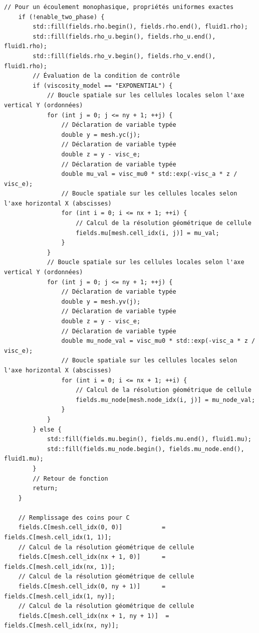 \documentclass[10pt,a4paper,oneside]{book}
\begin{document}
\begin{lstlisting}[language={[11]C++}]
    // Pour un écoulement monophasique, propriétés uniformes exactes
    if (!enable_two_phase) {
        std::fill(fields.rho.begin(), fields.rho.end(), fluid1.rho);
        std::fill(fields.rho_u.begin(), fields.rho_u.end(), fluid1.rho);
        std::fill(fields.rho_v.begin(), fields.rho_v.end(), fluid1.rho);
        // Évaluation de la condition de contrôle
        if (viscosity_model == "EXPONENTIAL") {
            // Boucle spatiale sur les cellules locales selon l'axe vertical Y (ordonnées)
            for (int j = 0; j <= ny + 1; ++j) {
                // Déclaration de variable typée
                double y = mesh.yc(j);
                // Déclaration de variable typée
                double z = y - visc_e;
                // Déclaration de variable typée
                double mu_val = visc_mu0 * std::exp(-visc_a * z / visc_e);
                // Boucle spatiale sur les cellules locales selon l'axe horizontal X (abscisses)
                for (int i = 0; i <= nx + 1; ++i) {
                    // Calcul de la résolution géométrique de cellule
                    fields.mu[mesh.cell_idx(i, j)] = mu_val;
                }
            }
            // Boucle spatiale sur les cellules locales selon l'axe vertical Y (ordonnées)
            for (int j = 0; j <= ny + 1; ++j) {
                // Déclaration de variable typée
                double y = mesh.yv(j);
                // Déclaration de variable typée
                double z = y - visc_e;
                // Déclaration de variable typée
                double mu_node_val = visc_mu0 * std::exp(-visc_a * z / visc_e);
                // Boucle spatiale sur les cellules locales selon l'axe horizontal X (abscisses)
                for (int i = 0; i <= nx + 1; ++i) {
                    // Calcul de la résolution géométrique de cellule
                    fields.mu_node[mesh.node_idx(i, j)] = mu_node_val;
                }
            }
        } else {
            std::fill(fields.mu.begin(), fields.mu.end(), fluid1.mu);
            std::fill(fields.mu_node.begin(), fields.mu_node.end(), fluid1.mu);
        }
        // Retour de fonction
        return;
    }

    // Remplissage des coins pour C
    fields.C[mesh.cell_idx(0, 0)]           = fields.C[mesh.cell_idx(1, 1)];
    // Calcul de la résolution géométrique de cellule
    fields.C[mesh.cell_idx(nx + 1, 0)]      = fields.C[mesh.cell_idx(nx, 1)];
    // Calcul de la résolution géométrique de cellule
    fields.C[mesh.cell_idx(0, ny + 1)]      = fields.C[mesh.cell_idx(1, ny)];
    // Calcul de la résolution géométrique de cellule
    fields.C[mesh.cell_idx(nx + 1, ny + 1)]  = fields.C[mesh.cell_idx(nx, ny)];


\end{lstlisting}
\end{document}

